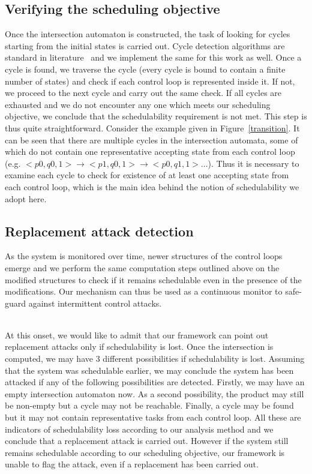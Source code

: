 \subsection{Verifying the scheduling objective}
\noindent
Once the intersection automaton is constructed, the task of looking for cycles starting from the initial states is carried out. Cycle detection algorithms are standard in literature~\cite{Clarke:2000:MC:332656} and we implement the same for this work as well. Once a cycle is found, we traverse the cycle (every cycle is bound to contain a finite number of states) and check if each control loop is represented inside it. If not, we proceed to the next cycle and carry out the same check. If all cycles are exhausted and we do not encounter any one which meets our scheduling objective, we conclude that the schedulability requirement is not met. This step is thus quite straightforward. Consider the example given in Figure~\ref{transition}. It can be seen that there are multiple cycles in the intersection automata, some of which do not contain one representative accepting state from each control loop (e.g. $<p0,q0,1> \rightarrow <p1,q0,1> \rightarrow <p0,q1,1> \ldots$). Thus it is necessary to examine each cycle to check for existence of at least one accepting state from each control loop, which is the main idea behind the notion of schedulability we adopt here. 

\subsection{Replacement attack detection}
\noindent
As the system is monitored over time, newer structures of the control loops emerge and we perform the same computation steps outlined above on the modified structures to check if it remains schedulable even in the presence of the modifications. Our mechanism can thus be used as a continuous monitor to safe-guard against intermittent control attacks. 

~\\
\noindent
At this onset, we would like to admit that our framework can point out replacement attacks only if schedulability is lost. Once the intersection is computed, we may have 3 different possibilities if schedulability is lost. Assuming that the system was schedulable earlier, we may conclude the system has been attacked if any of the following possibilities are detected. Firstly, we may have an empty intersection automaton now. As a second possibility, the product may still be non-empty but a cycle may not be reachable. Finally, a cycle may be found but it may not contain representative tasks from each control loop. All these are indicators of schedulability loss according to our analysis method and we conclude that a replacement attack is carried out. However if the system still remains schedulable according to our scheduling objective, our framework is unable to flag the attack, even if a replacement has been carried out.